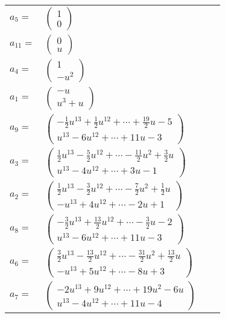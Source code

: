 \documentclass[1p]{elsarticle_modified}
\theoremstyle{definition}
\begin{document}
\begin{tabular}{m{7pt} m{180pt} m{7pt} m{180pt} }
\flushright $a_{5}=$&$\begin{pmatrix}1\\0\end{pmatrix}$ \\
\flushright $a_{11}=$&$\begin{pmatrix}0\\u\end{pmatrix}$ \\
\flushright $a_{4}=$&$\begin{pmatrix}1\\- u^2\end{pmatrix}$ \\
\flushright $a_{1}=$&$\begin{pmatrix}- u\\u^3+u\end{pmatrix}$ \\
\flushright $a_{9}=$&$\begin{pmatrix}-\frac{1}{2} u^{13}+\frac{1}{2} u^{12}+\cdots+\frac{19}{2} u-5\\u^{13}-6 u^{12}+\cdots+11 u-3\end{pmatrix}$ \\
\flushright $a_{3}=$&$\begin{pmatrix}\frac{1}{2} u^{13}-\frac{5}{2} u^{12}+\cdots-\frac{11}{2} u^2+\frac{3}{2} u\\u^{13}-4 u^{12}+\cdots+3 u-1\end{pmatrix}$ \\
\flushright $a_{2}=$&$\begin{pmatrix}\frac{1}{2} u^{13}-\frac{3}{2} u^{12}+\cdots-\frac{7}{2} u^2+\frac{1}{2} u\\- u^{13}+4 u^{12}+\cdots-2 u+1\end{pmatrix}$ \\
\flushright $a_{8}=$&$\begin{pmatrix}-\frac{3}{2} u^{13}+\frac{13}{2} u^{12}+\cdots-\frac{3}{2} u-2\\u^{13}-6 u^{12}+\cdots+11 u-3\end{pmatrix}$ \\
\flushright $a_{6}=$&$\begin{pmatrix}\frac{3}{2} u^{13}-\frac{13}{2} u^{12}+\cdots-\frac{31}{2} u^2+\frac{13}{2} u\\- u^{13}+5 u^{12}+\cdots-8 u+3\end{pmatrix}$ \\
\flushright $a_{7}=$&$\begin{pmatrix}-2 u^{13}+9 u^{12}+\cdots+19 u^2-6 u\\u^{13}-4 u^{12}+\cdots+11 u-4\end{pmatrix}$ \\

\end{tabular}
\end{document}
